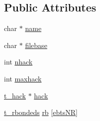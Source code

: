 \subsection*{\-Public \-Attributes}
\begin{DoxyCompactItemize}
\item 
char $\ast$ \hyperlink{structt__hackblock_abeb839d3d420dcabb58d2c0bb0b82fe3}{name}
\item 
char $\ast$ \hyperlink{structt__hackblock_a912af54e9f133a63ecfdb10588159632}{filebase}
\item 
int \hyperlink{structt__hackblock_a8965345a2da601395c5d376c4317916d}{nhack}
\item 
int \hyperlink{structt__hackblock_a4bde750e964691cfc69f913cb253fc53}{maxhack}
\item 
\hyperlink{structt__hack}{t\-\_\-hack} $\ast$ \hyperlink{structt__hackblock_aa0d7d0329d37f7384c7ee18f4cce35ea}{hack}
\item 
\hyperlink{structt__rbondeds}{t\-\_\-rbondeds} \hyperlink{structt__hackblock_aab9b5e1c561813d03174820e9418dd45}{rb} \mbox{[}\hyperlink{share_2template_2gromacs_2hackblock_8h_a3153161a0d848ec64bf4895db3cf1be4a018bbf49e461419a9fce05a412e904ae}{ebts\-N\-R}\mbox{]}
\end{DoxyCompactItemize}


